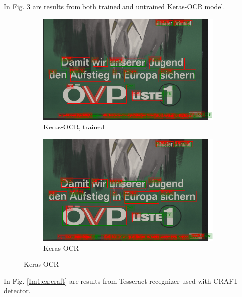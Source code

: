 In Fig. \ref{Im1:ex:Keras} are results from both trained and untrained Keras-OCR model.

\begin{figure}[hbtp!]
    \begin{subfigure}{\textwidth}
        \centering
        \includegraphics[scale=0.36]{obrazky/plakaty/result_kerasOCRtrained_vienna1_split-90.png}
        \caption{Keras-OCR, trained}
        \label{Im1:ex:kertr}
    \end{subfigure}

    \begin{subfigure}{\textwidth}
        \centering
        \includegraphics[scale=0.36]{obrazky/plakaty/result_kerasOCR_vienna1_nosplit_nocorrection-90.png}
        \caption{Keras-OCR}
        \label{Im1:ex:ker}
    \end{subfigure}
    
    \caption{Keras-OCR}
    \label{Im1:ex:Keras}
\end{figure}


In Fig. \ref{Im1:ex:craft} are results from Tesseract recognizer used with CRAFT detector.

